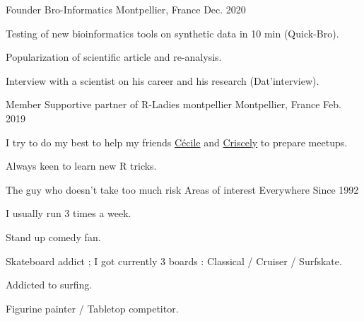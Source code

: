 

\begin{cventries}

  \cventry
    {Founder} %
    {Bro-Informatics} %
    {Montpellier, France} %
    {Dec. 2020} %
    {
      \begin{cvitems} %
        \item {Testing of new bioinformatics tools on synthetic data in 10 min (Quick-Bro).}
        \item {Popularization of scientific article and re-analysis.}
        \item {Interview with a scientist on his career and his research (Dat'interview).}
      \end{cvitems}
    }

  \cventry
    {Member} %
    {Supportive partner of R-Ladies montpellier} %
    {Montpellier, France} %
    {Feb. 2019} %
    {
      \begin{cvitems} %
        \item {I try to do my best to help my friends \href{https://github.com/cecilesauder}{Cécile} and \href{https://github.com/CriscelyLP}{Criscely} to prepare meetups.}
        \item {Always keen to learn new R tricks.}
      \end{cvitems}
    }
    
  \cventry
    {The guy who doesn't take too much risk} %
    {Areas of interest} %
    {Everywhere} %
    {Since 1992} %
    {
      \begin{cvitems} %
        \item {I usually run 3 times a week.}
        \item {Stand up comedy fan.}
        \item {Skateboard addict ; I got currently 3 boards : Classical / Cruiser / Surfskate.}
        \item {Addicted to surfing.}
        \item {Figurine painter / Tabletop competitor.}
      \end{cvitems}
    }

\end{cventries}
